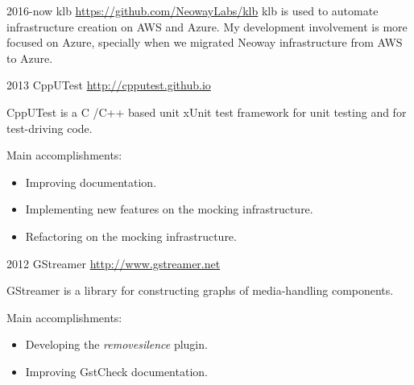 \documentclass[]{friggeri-cv} %
\begin{document}
\begin{entrylist}
\entry
{2016-now}
{klb}
{\href{https://github.com/NeowayLabs/klb}{https://github.com/NeowayLabs/klb}}
{
    klb is used to automate infrastructure creation on AWS and Azure.
    My development involvement is more focused on Azure, specially when
    we migrated Neoway infrastructure from AWS to Azure.
}
\end{entrylist}

\begin{entrylist}
\entry
{2013}
{CppUTest}
{\href{http://cpputest.github.io}{http://cpputest.github.io}}
{
CppUTest is a C /C++ based unit xUnit test framework for unit testing and for test-driving code.

Main accomplishments:\\
\begin{itemize}
\item Improving documentation.
\item Implementing new features on the mocking infrastructure.
\item Refactoring on the mocking infrastructure.
\end{itemize}
}
\end{entrylist}

\begin{entrylist}
\entry
{2012}
{GStreamer}
{\href{http://www.gstreamer.net}{http://www.gstreamer.net}}
{
GStreamer is a library for constructing graphs of media-handling components.

Main accomplishments:\\
\begin{itemize}
\item Developing the \emph{removesilence} plugin.
\item Improving GstCheck documentation.
\end{itemize}
}
\end{entrylist}
\end{document}
